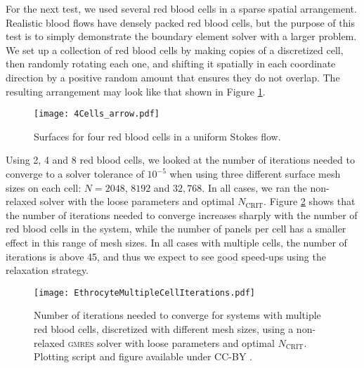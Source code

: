 \documentclass[smallcondensed,final]{svjour3}
\newcommand{\ncrit}{N_{\text{CRIT}}}
\newcommand{\gmres}{\textsc{gmres}\xspace}
\begin{document}
For the next test, we used several red blood cells in a sparse spatial arrangement. Realistic blood flows have densely packed red blood cells, but the purpose of this test is to simply demonstrate the boundary element solver with a larger problem. We set up a collection of red blood cells by making copies of a discretized cell, then randomly rotating each one, and shifting it spatially in each  coordinate direction by a positive random amount that ensures they do not overlap. The resulting arrangement may look like that shown in Figure \ref{fig:multiple_cells}.


\begin{figure}[ht]
\begin{center}
\texttt{[image: 4Cells\_arrow.pdf]}
	\caption{Surfaces for four red blood cells in a uniform Stokes flow.}
	\label{fig:multiple_cells}
\end{center}
\end{figure}

Using 2, 4 and 8 red blood cells, we looked at the number of iterations needed to converge to a solver tolerance of $10^{-5}$ when using three different surface mesh sizes on each cell: $N=2048$, $8192$ and $32,768$. In all cases, we ran the non-relaxed solver with the loose parameters and optimal $\ncrit$. Figure \ref{fig:multiple_cell_iterations} shows that the number of iterations needed to converge increases sharply with the number of red blood cells in the system, while the number of panels per cell has a smaller effect in this range of mesh sizes. In all cases with multiple cells, the number of iterations is above 45, and thus we expect to see good speed-ups using the relaxation strategy.



\begin{figure}
\begin{center}
	\texttt{[image: EthrocyteMultipleCellIterations.pdf]}
	\caption{Number of iterations needed to converge for systems with multiple red blood cells, discretized with different mesh sizes, using a non-relaxed \gmres solver with loose parameters and optimal $\ncrit$. Plotting script and figure available under CC-BY \cite{WangLaytonBarba2016-figshare4}.}
	\label{fig:multiple_cell_iterations}
\end{center}
\end{figure}
\end{document}
